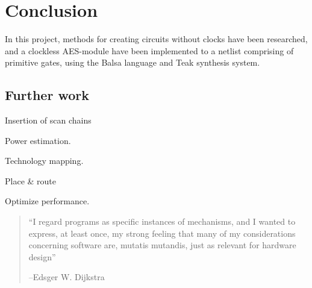 \section{Conclusion}

In this project, methods for creating circuits without clocks have
been researched, and a clockless AES-module have been implemented to a
netlist comprising of primitive gates, using the Balsa language and
Teak synthesis system.

\subsection{Further work}

Insertion of scan chains

Power estimation.

Technology mapping.

Place & route

Optimize performance.

\begin{quotation}
  ``I regard programs as specific instances of mechanisms, and I wanted
  to express, at least once, my strong feeling that many of my
  considerations concerning software are, mutatis mutandis, just as
  relevant for hardware design''

  --Edsger W. Dijkstra
\end{quotation}

